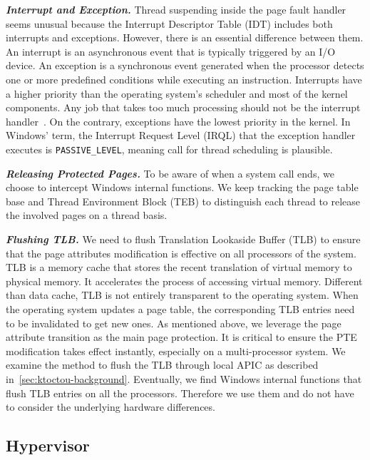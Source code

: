 \textbf{\textit{Interrupt and Exception.}} Thread suspending inside the page fault handler seems unusual because the Interrupt Descriptor Table (IDT) includes both interrupts and exceptions. However, there is an essential difference between them. An interrupt is an asynchronous event that is typically triggered by an I/O device. An exception is a synchronous event generated when the processor detects one or more predefined conditions while executing an instruction. Interrupts have a higher priority than the operating system's scheduler and most of the kernel components. Any job that takes too much processing should not be the interrupt handler~\cite{msdnwatchdog}.  On the contrary, exceptions have the lowest priority in the kernel. In Windows' term, the Interrupt Request Level (IRQL) that the exception handler executes is \texttt{PASSIVE\_LEVEL}, meaning call for thread scheduling is plausible.



\textbf{\textit{Releasing Protected Pages.}} To be aware of when a system call ends, we choose to intercept Windows internal functions. We keep tracking the page table base and Thread Environment Block (TEB) to distinguish each thread to release the involved pages on a thread basis.



\textbf{\textit{Flushing TLB.}} We need to flush Translation Lookaside Buffer (TLB) to ensure that the page attributes modification is effective on all processors of the system. TLB is a memory cache that stores the recent translation of virtual memory to physical memory. It accelerates the process of accessing virtual memory. Different than data cache, TLB is not entirely transparent to the operating system. When the operating system updates a page table, the corresponding TLB entries need to be invalidated to get new ones. As mentioned above, we leverage the page attribute transition as the main page protection. It is critical to ensure the PTE modification takes effect instantly, especially on a multi-processor system. We examine the method to flush the TLB through local APIC as described in~\autoref{sec:ktoctou-background}. Eventually, we find Windows internal functions that flush TLB entries on all the processors. Therefore we use them and do not have to consider the underlying hardware differences.


\subsection{Hypervisor}


